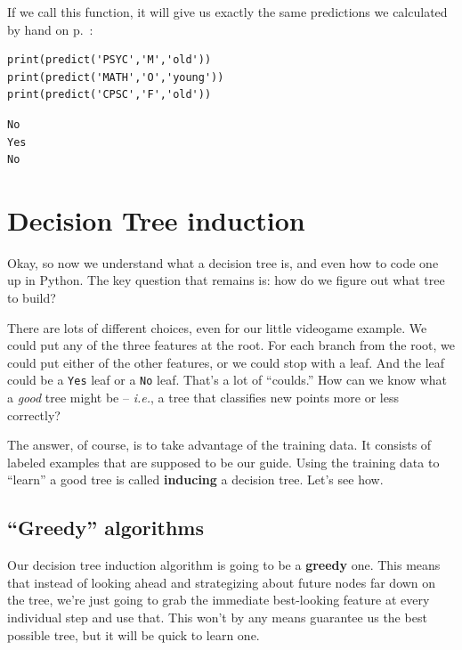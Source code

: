 \begin{samepage}
If we call this function, it will give us exactly the same predictions we
calculated by hand on p.~\pageref{decisionTreeExamples}:

\begin{Verbatim}[fontsize=\footnotesize,samepage=true,frame=single,framesep=3mm]
print(predict('PSYC','M','old'))
print(predict('MATH','O','young'))
print(predict('CPSC','F','old'))
\end{Verbatim}
\vspace{-.2in}

\begin{Verbatim}[fontsize=\footnotesize,samepage=true,frame=leftline,framesep=5mm,framerule=1mm]
No
Yes
No
\end{Verbatim}
\end{samepage}

\section{Decision Tree induction}

Okay, so now we understand what a decision tree is, and even how to code one up
in Python. The key question that remains is: how do we figure out what tree to
build?

There are lots of different choices, even for our little videogame example. We
could put any of the three features at the root. For each branch from the root,
we could put either of the other features, or we could stop with a leaf. And
the leaf could be a \texttt{Yes} leaf or a \texttt{No} leaf. That's a lot of
``coulds.'' How can we know what a \textit{good} tree might be --
\textit{i.e.}, a tree that classifies new points more or less correctly?


The answer, of course, is to take advantage of the training data. It consists
of labeled examples that are supposed to be our guide. Using the training data
to ``learn'' a good tree is called \textbf{inducing} a decision tree. Let's see
how.

\subsection{``Greedy'' algorithms}


Our decision tree induction algorithm is going to be a \textbf{greedy} one.
This means that instead of looking ahead and strategizing about future nodes
far down on the tree, we're just going to grab the immediate best-looking
feature at every individual step and use that. This won't by any means
guarantee us the best possible tree, but it will be quick to learn one.

